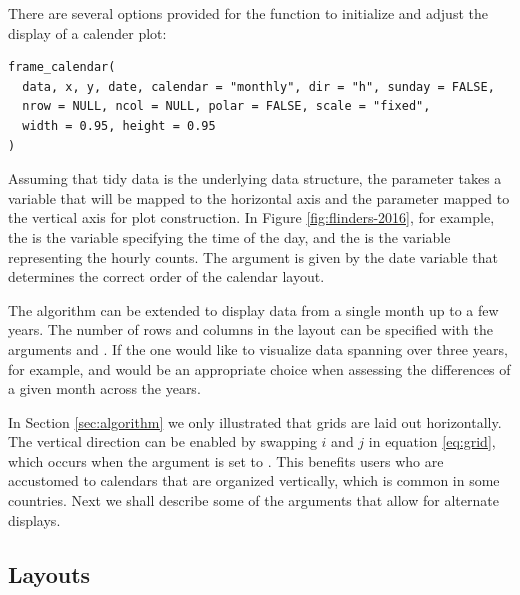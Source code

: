 \documentclass[article]{jss}
\theoremstyle{definition}
\theoremstyle{definition}
\theoremstyle{remark}
\begin{document}
\label{sec:opt}

There are several options provided for the 
function to initialize and adjust the display of a calender plot:

\begin{verbatim}
frame_calendar(
  data, x, y, date, calendar = "monthly", dir = "h", sunday = FALSE, 
  nrow = NULL, ncol = NULL, polar = FALSE, scale = "fixed",
  width = 0.95, height = 0.95
)
\end{verbatim}

Assuming that tidy data \citep{wickham2014tidy} is the underlying data
structure, the parameter  takes a variable that will be mapped
to the horizontal axis and the parameter  mapped to the vertical
axis for plot construction. In Figure \ref{fig:flinders-2016}, for
example, the  is the variable specifying the time of the day,
and the  is the variable representing the hourly counts. The
 argument is given by the date variable that determines the
correct order of the calendar layout.

The algorithm can be extended to display data from a single month up to
a few years. The number of rows and columns in the layout can be
specified with the arguments  and . If the one
would like to visualize data spanning over three years, for example,
 and  would be an appropriate choice when
assessing the differences of a given month across the years.

In Section \ref{sec:algorithm} we only illustrated that grids are laid
out horizontally. The vertical direction can be enabled by swapping
\(i\) and \(j\) in equation \eqref{eq:grid}, which occurs when the
argument  is set to . This benefits users who are
accustomed to calendars that are organized vertically, which is common
in some countries. Next we shall describe some of the arguments that
allow for alternate displays.

\subsection{Layouts}\label{layouts}
\end{document}
